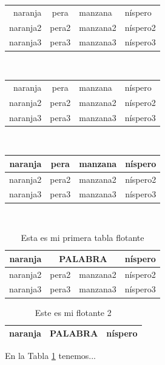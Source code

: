 \documentclass{report}
\begin{document}
\begin{tabular}{rcll}
naranja & pera & manzana & níspero \\
naranja2 & pera2 & manzana2 & níspero2 \\
naranja3 & pera3 & manzana3 & níspero3 \\
\end{tabular}

\ \\[1cm]

\begin{tabular}{|r|c|l|l|}
	naranja & pera & manzana & níspero \\
	naranja2 & pera2 & manzana2 & níspero2 \\
	naranja3 & pera3 & manzana3 & níspero3 \\
\end{tabular}

\ \\[1cm]

\begin{tabular}{rcll}
	\hline
	naranja & pera & manzana & níspero \\
	\hline
	naranja2 & pera2 & manzana2 & níspero2 \\
	\hline
	naranja3 & pera3 & manzana3 & níspero3 \\
	\hline
\end{tabular}

\ \\[1cm]

\begin{table}[H]
	\centering
\caption{Esta es mi primera tabla flotante}
\begin{tabular}{|r|c|l|p{3cm}|}
	\hline
	naranja & \multicolumn{2}{c|}{PALABRA} & níspero \\
	\hline
	naranja2 & pera2 & manzana2 & níspero2 \\
	\cline{3-4}
	naranja3 & pera3 & manzana3 & níspero3 \\
	\hline
\end{tabular}
\end{table}

\begin{table}[H]
	\centering
	\caption{Este es mi flotante 2}\label{tab1}
	\begin{tabular}{|r|c|l|p{3cm}|}
		\hline
		naranja & \multicolumn{2}{c|}{PALABRA} & níspero \\
		\hline
	\end{tabular}
\end{table}

En la Tabla \ref{tab1} tenemos... 
\end{document}
